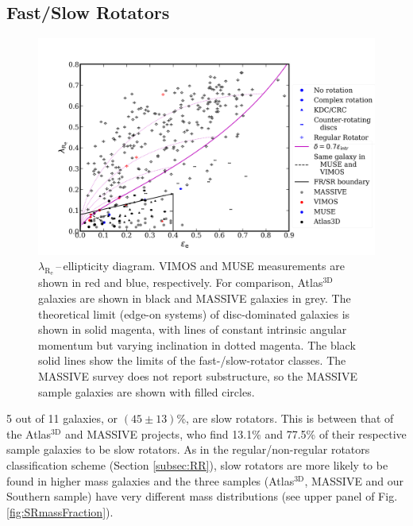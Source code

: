 \documentclass[a4paper,fleqn,usenatbib]{mnras}
\begin{document}
	\subsection{Fast/Slow Rotators}
		\begin{figure}
			\includegraphics[width=\columnwidth]{lambda_R_ellipticity.png}
			\caption{$\lambda_\mathrm{R_e}$\,--\,ellipticity diagram. VIMOS and MUSE measurements are shown in red and blue, respectively. For comparison, Atlas$^\text{3D}$ galaxies \citep{Emsellem2011} are shown in black and MASSIVE galaxies \citep{Veale2017} in grey. The theoretical limit (edge-on systems) of disc-dominated galaxies is shown in solid magenta, with lines of constant intrinsic angular momentum but varying inclination in dotted magenta. The black solid lines show the limits of the fast-/slow-rotator classes. The MASSIVE survey does not report substructure, so the MASSIVE sample galaxies are shown with filled circles.}
			\label{fig:lambdaR_ellip}
		\end{figure}


		5 out of 11 galaxies, or $(45\pm13)$\%, are slow rotators. This is between that of the Atlas$^\text{3D}$ and MASSIVE projects, who find 13.1\% and 77.5\% of their respective sample galaxies to be slow rotators. As in the regular/non-regular rotators classification scheme (Section \ref{subsec:RR}), slow rotators are more likely to be found in higher mass galaxies and the three samples (Atlas$^\text{3D}$, MASSIVE and our Southern sample) have very different mass distributions (see upper panel of Fig.\,\ref{fig:SRmassFraction}).
\end{document}
